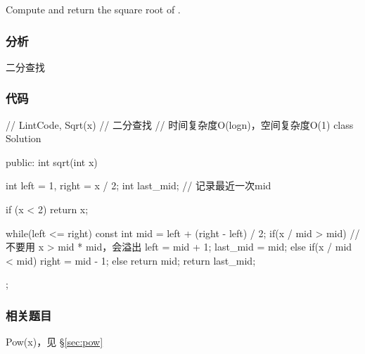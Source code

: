 Compute and return the square root of .


\subsubsection{分析}
二分查找


\subsubsection{代码}
\begin{Code}
// LintCode, Sqrt(x)
// 二分查找
// 时间复杂度O(logn)，空间复杂度O(1)
class Solution {
public:
    int sqrt(int x) {
        int left = 1, right = x / 2;
        int last_mid;  // 记录最近一次mid

        if (x < 2) return x;

        while(left <= right) {
            const int mid = left + (right - left) / 2;
            if(x / mid > mid) { // 不要用 x > mid * mid，会溢出
                left = mid + 1;
                last_mid = mid;
            } else if(x / mid < mid) {
                right = mid - 1;
            } else {
                return mid;
            }
        }
        return last_mid;
    }
};
\end{Code}


\subsubsection{相关题目}
\begindot
\item Pow(x)，见 \S \ref{sec:pow}
\myenddot
